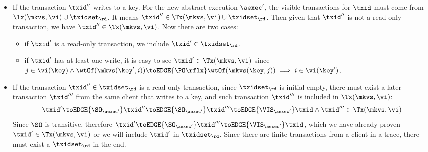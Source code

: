 \begin{itemize}
\item If the transaction \( \txid'' \) writes to a key.
For the new abstract execution \( \aexec' \), the visible transactions for \( \txid \) must come from \( \Tx(\mkvs, \vi) \cup \txidset_\rd \).
It means \( \txid'' \in \Tx(\mkvs, \vi) \cup \txidset_\rd  \).
Then given that \( \txid'' \) is not a read-only transaction, we have \( \txid'' \in \Tx(\mkvs, \vi) \).
Now there are two cases:
\begin{itemize}
    \item if \( \txid' \) is a read-only transaction, we include \( \txid' \in \txidset_{\rd} \).
    \item if \( \txid' \) has at least one write, it is easy to see \( \txid' \in \Tx(\mkvs, \vi) \) since \( j \in \vi(\key) \wedge \wtOf(\mkvs(\key', i)) \toEDGE{\PO\rflx} \wtOf(\mkvs(\key, j)) \implies i \in \vi(\key') \).
\end{itemize}
\item If the transaction \( \txid'' \in \txidset_\rd \) is a read-only transaction, 
since \( \txidset_\rd \) is initial empty, there must exist a later transaction \( \txid''' \) from the same client that writes to a key,
and such transaction \( \txid''' \) is included in \( \Tx(\mkvs, \vi) \):
\[
    \txid' \toEDGE{\SO_{\aexec'}} \txid'' 
    \toEDGE{\SO_{\aexec'}} \txid''' \toEDGE{\VIS_{\aexec'}} \txid 
    \land \txid''' \in \Tx(\mkvs,\vi)
\]
Since \( \SO \) is transitive, 
therefore \( \txid' \toEDGE{\SO_{\aexec'}} \txid''' \toEDGE{\VIS_{\aexec'}} \txid \),
which we have already proven \( \txid' \in \Tx(\mkvs, \vi) \) or we will include \( \txid' \) in \( \txidset_\rd \).
Since there are finite transactions from a client in a trace, there must exist a \( \txidset_\rd \) in the end.
\end{itemize}


